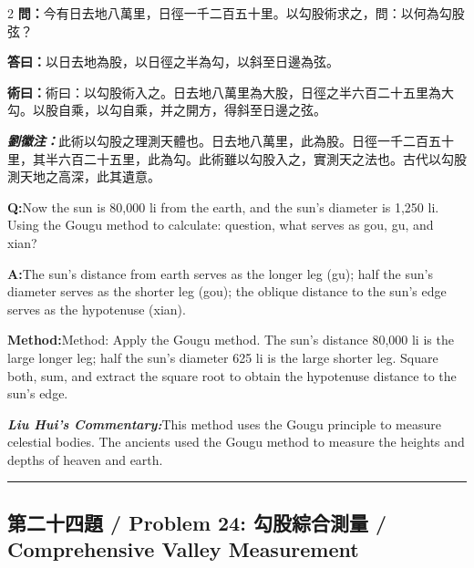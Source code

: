 \documentclass[11pt,a4paper]{article}
\newcommand{\cnwen}{\textcolor{cnlabelfg}{\textbf{問：}}}
\newcommand{\cnda}{\textbf{答曰：}}
\newcommand{\cnshu}{\textcolor{cnlabelfg}{\textbf{術曰：}}}
\newcommand{\cnzhu}{\textcolor{commentarycolor}{\textit{\textbf{劉徽注：}}}}
\newcommand{\enwen}{\textcolor{enlabelfg}{\textbf{Q:}}}
\newcommand{\enda}{\textcolor{enlabelfg}{\textbf{A:}}}
\newcommand{\enshu}{\textcolor{enlabelfg}{\textbf{Method:}}}
\newcommand{\enzhu}{\textcolor{enlabelfg}{\textit{\textbf{Liu Hui's Commentary:}}}}
\begin{document}
\begin{paracol}{2}
\switchcolumn[0]
\cnwen 今有日去地八萬里，日徑一千二百五十里。以勾股術求之，問：以何為勾股弦？

\cnda 以日去地為股，以日徑之半為勾，以斜至日邊為弦。

\cnshu 術曰：以勾股術入之。日去地八萬里為大股，日徑之半六百二十五里為大勾。以股自乘，以勾自乘，并之開方，得斜至日邊之弦。

\cnzhu 此術以勾股之理測天體也。日去地八萬里，此為股。日徑一千二百五十里，其半六百二十五里，此為勾。此術雖以勾股入之，實測天之法也。古代以勾股測天地之高深，此其遺意。

\switchcolumn[1]
\enwen Now the sun is 80,000 li from the earth, and the sun's diameter is 1,250 li. Using the Gougu method to calculate: question, what serves as gou, gu, and xian?

\enda The sun's distance from earth serves as the longer leg (gu); half the sun's diameter serves as the shorter leg (gou); the oblique distance to the sun's edge serves as the hypotenuse (xian).

\enshu Method: Apply the Gougu method. The sun's distance 80,000 li is the large longer leg; half the sun's diameter 625 li is the large shorter leg. Square both, sum, and extract the square root to obtain the hypotenuse distance to the sun's edge.

\enzhu This method uses the Gougu principle to measure celestial bodies. The ancients used the Gougu method to measure the heights and depths of heaven and earth.
\end{paracol}

\bigskip\hrule\bigskip

\subsection{第二十四題 / Problem 24: 勾股綜合測量 / Comprehensive Valley Measurement}
\end{document}
